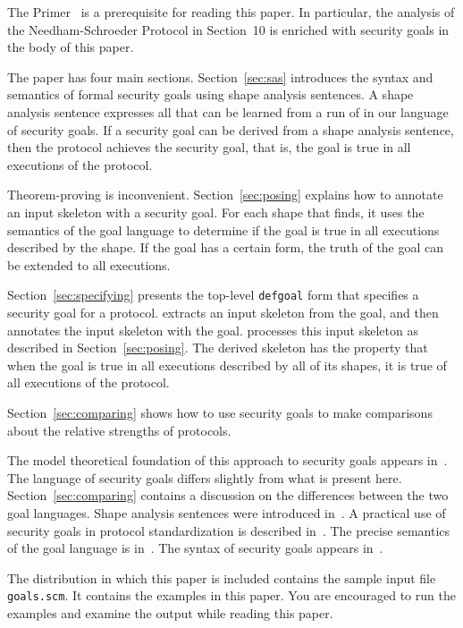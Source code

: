 \documentclass[12pt]{article}
\begin{document}
The {\cpsa} Primer~\cite{cpsaprimer09} is a prerequisite for reading
this paper.  In particular, the analysis of the Needham-Schroeder
Protocol in Section~10 is enriched with security goals in the body of
this paper.

The paper has four main sections.  Section~\ref{sec:sas} introduces
the syntax and semantics of formal security goals using shape analysis
sentences.  A shape analysis sentence expresses all that can be
learned from a run of {\cpsa} in our language of security goals.  If a
security goal can be derived from a shape analysis sentence, then the
protocol achieves the security goal, that is, the goal is true in all
executions of the protocol.

Theorem-proving is inconvenient.  Section~\ref{sec:posing} explains
how to annotate an input skeleton with a security goal.  For each
shape that {\cpsa} finds, it uses the semantics of the goal language
to determine if the goal is true in all executions described by the
shape.  If the goal has a certain form, the truth of the goal can be
extended to all executions.

Section~\ref{sec:specifying} presents the top-level \texttt{defgoal}
form that specifies a security goal for a protocol.  {\cpsa} extracts
an input skeleton from the goal, and then annotates the input skeleton
with the goal.  {\cpsa} processes this input skeleton as described in
Section~\ref{sec:posing}.  The derived skeleton has the property that
when the goal is true in all executions described by all of its shapes,
it is true of all executions of the protocol.

Section~\ref{sec:comparing} shows how to use security goals to make
comparisons about the relative strengths of protocols.

The model theoretical foundation of this approach to security goals
appears in~\cite{Guttman14}.  The language of security goals differs
slightly from what is present here.  Section~\ref{sec:comparing}
contains a discussion on the differences between the two goal
languages.  Shape analysis sentences were introduced
in~\cite{Ramsdell12}.  A practical use of security goals in protocol
standardization is described in~\cite{GuttmanLiskovRowe14}.  The
precise semantics of the goal language is in~\cite{cpsaspec09}.  The
syntax of security goals appears in~\cite[Table~2]{cpsaprimer09}.

The distribution in which this paper is included contains the sample
input {\cpsa} file \texttt{goals.scm}.  It contains the examples in
this paper.  You are encouraged to run the examples and examine the
output while reading this paper.
\end{document}
